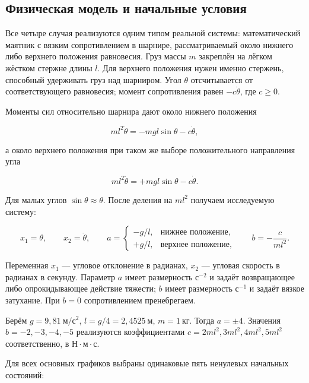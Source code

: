 \subsection{Физическая модель и начальные условия}

Все четыре случая реализуются одним типом реальной системы: математический маятник с вязким сопротивлением в шарнире, рассматриваемый около нижнего либо верхнего положения равновесия. Груз массы $m$ закреплён на лёгком жёстком стержне длины $l$. Для верхнего положения нужен именно стержень, способный удерживать груз над шарниром. Угол $\theta$ отсчитывается от соответствующего равновесия; момент сопротивления равен $-c\dot\theta$, где $c\geq0$.

Моменты сил относительно шарнира дают около нижнего положения

\begin{equation}
ml^2\ddot\theta=-mgl\sin\theta-c\dot\theta,
\end{equation}

а около верхнего положения при таком же выборе положительного направления угла

\begin{equation}
ml^2\ddot\theta=+mgl\sin\theta-c\dot\theta.
\end{equation}

Для малых углов $\sin\theta\approx\theta$. После деления на $ml^2$ получаем исследуемую систему:

\begin{equation}
x_1=\theta,\qquad x_2=\dot\theta,\qquad
a=\begin{cases}-g/l,&\text{нижнее положение},\\+g/l,&\text{верхнее положение},\end{cases}
\qquad b=-\frac{c}{ml^2}.
\end{equation}

Переменная $x_1$ — угловое отклонение в радианах, $x_2$ — угловая скорость в радианах в секунду. Параметр $a$ имеет размерность $\mathrm{с}^{-2}$ и задаёт возвращающее либо опрокидывающее действие тяжести; $b$ имеет размерность $\mathrm{с}^{-1}$ и задаёт вязкое затухание. При $b=0$ сопротивлением пренебрегаем.

Берём $g=9{,}81\ \mathrm{м/с^2}$, $l=g/4=2{,}4525\ \mathrm{м}$, $m=1\ \mathrm{кг}$. Тогда $a=\pm4$. Значения $b=-2,-3,-4,-5$ реализуются коэффициентами $c=2ml^2,3ml^2,4ml^2,5ml^2$ соответственно, в $\mathrm{Н\cdot м\cdot с}$.

Для всех основных графиков выбраны одинаковые пять ненулевых начальных состояний:


